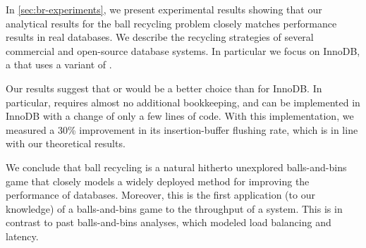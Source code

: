 In \cref{sec:br-experiments}, we present experimental results showing that our
analytical results for the ball recycling problem closely matches performance
results in real databases.  We describe the recycling strategies of several
commercial and open-source database systems. In particular we focus on InnoDB,
a \btree{} that uses a variant of \RB.

Our results suggest that \FB or \GG would be a better choice than \RB for
InnoDB. In particular, \GG requires almost no additional bookkeeping, and can
be implemented in InnoDB with a change of only a few lines of code.
With this implementation, we measured a 30\% improvement in its
insertion-buffer flushing rate, which is in line with our theoretical results.

We conclude that ball recycling is a natural hitherto unexplored balls-and-bins
game that closely models a widely deployed method for improving the performance
of databases. Moreover, this is the first application (to our knowledge) of a
balls-and-bins game to the throughput of a system. This is in contrast to past
balls-and-bins analyses, which modeled load balancing and latency.


